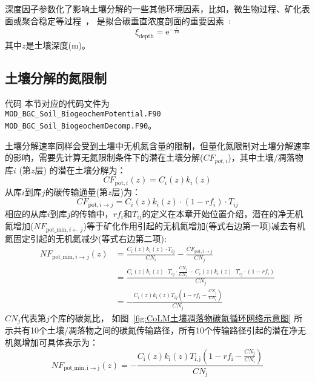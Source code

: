 深度因子参数化了影响土壤分解的一些其他环境因素，比如，微生物过程、矿化表面或聚合稳定等过程~\citep{koven2013effect}，
是拟合碳垂直浓度剖面的重要因素~\citep{jenkinson2008turnover}:
\begin{equation}
  \xi_{\mathrm{d e p t h}}={\mathrm e}^{-\frac{z}{10}}
\end{equation}
其中$z$是土壤深度(m)。


\subsection{土壤分解的氮限制}\label{土壤分解的氮限制}
\begin{mymdframed}{代码}
  本节对应的代码文件为\\ \texttt{MOD\_BGC\_Soil\_BiogeochemPotential.F90}\\
  \texttt{MOD\_BGC\_Soil\_BiogeochemDecomp.F90}。
\end{mymdframed}
土壤分解速率同样会受到土壤中无机氮含量的限制，但量化氮限制对土壤分解速率的影响，需要先计算无氮限制条件下的潜在土壤分解($CF_{pot,i}$)，其中土壤/凋落物库$i$ (第$z$层) 的潜在土壤分解为：
\begin{equation}
  C F_{\mathrm{pot},i}(z)=C_{i}(z) k_{i}(z)
\end{equation}
从库$i$到库$j$的碳传输通量(第$z$层)为：
\begin{equation}
  C F_{\mathrm{pot}, i \rightarrow j}=C_{i}(z) k_{i}(z) \cdot\left(1-r f_{i}\right) \cdot T_{i j}
\end{equation}
相应的从库$i$到库$j$的传输中，$r f_{i}$和$T_{i j}$的定义在本章开始位置介绍，潜在的净无机氮增加($NF_{\mathrm{pot\_min,}i\gets j}$)等于矿化作用引起的无机氮增加(等式右边第一项)减去有机氮固定引起的无机氮减少(等式右边第二项):
\begin{equation}
  \begin{aligned}
    NF_{\mathrm{pot\_min}, i \rightarrow j}\left(z\right)&=\frac{C_{i}(z) k_{i}(z) \cdot T_{ij}}{C N_{i}}-\frac{C F_{\mathrm{pot}, i \rightarrow j}}{C N_{j}} \\
    & =\frac{C_{i}(z) k_{i}(z) \cdot T_{i j} \cdot \frac{C N_{j}}{C N_{i}}-C_{i}(z) k_{i}(z) \cdot T_{i j} \cdot\left(1-r f_{i}\right)}{C N_{j}} \\
    &=-\frac{C_{i}(z) k_{i}(z) T_{i j}\left(1-r f_{i}-\frac{C N_{j}}{C N_{i}}\right)}{C N_{j}}
  \end{aligned}
\end{equation}
$C N_{j}$代表第$j$个库的碳氮比，
如图~\ref{fig:CoLM土壤凋落物碳氮循环网络示意图} 所示共有10个土壤/凋落物之间的碳氮传输路径，所有10个传输路径引起的潜在净无机氮增加可具体表示为：
\begin{equation}\label{NF_pot_minmet}
  NF_{\mathrm{{pot}\_{min,i \rightarrow {j}}}}(z)=-\frac{C_{\mathrm{{i}}}(z) k_{\mathrm{{i}}}(z) T_{\mathrm{i, j}}\left(1-r f_{\mathrm{i}}-\frac{C N_{\mathrm{{j }}}}{C N_{\mathrm{i}}}\right)}{C N_{\mathrm{{j }}}}
\end{equation}


